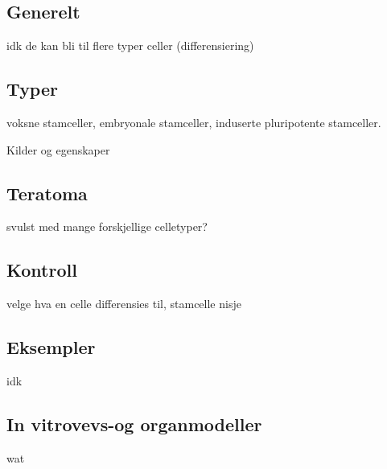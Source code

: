 \subsection{Generelt}
    idk de kan bli til flere typer celler (differensiering)

\subsection{Typer}
    voksne stamceller, embryonale stamceller, induserte pluripotente stamceller.
    
    Kilder og egenskaper

\subsection{Teratoma}
    svulst med mange forskjellige celletyper?

\subsection{Kontroll}
    velge hva en celle differensies til, stamcelle nisje

\subsection{Eksempler}
    idk

\subsection{In vitrovevs-og organmodeller }
    wat
